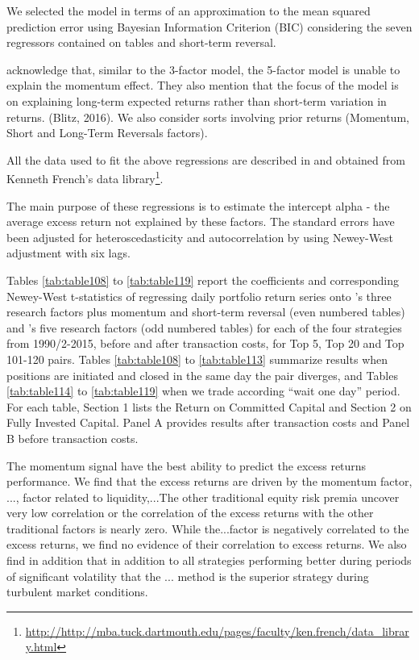 \documentclass[a4paper]{article}
\begin{document}
	We selected the model in terms of an approximation to the mean squared prediction error using Bayesian Information Criterion (BIC) \citet*{Schwarz1978} considering the seven regressors contained on tables and short-term reversal. 
	
	\citet*{fama2016} acknowledge that, similar to the 3-factor model, the 5-factor model is unable to explain the momentum effect. They also mention that the focus of the model is on explaining long-term expected returns rather than short-term variation in returns. (Blitz, 2016). We also consider sorts involving prior returns (Momentum, Short and Long-Term Reversals factors).
	
	All the data used to fit the above regressions are described in and obtained from Kenneth French’s data library\footnote{\url{http://http://mba.tuck.dartmouth.edu/pages/faculty/ken.french/data_library.html}}.
	
	The main purpose of these regressions is to estimate the intercept alpha - the average excess return not explained by these factors. The standard errors have been adjusted for heteroscedasticity and autocorrelation by using Newey-West adjustment with six lags.
	
	Tables \ref{tab:table108} to \ref{tab:table119} report the coefficients and corresponding Newey-West t-statistics of regressing daily portfolio return series onto \citet*{ff93}'s three research factors plus momentum and short-term reversal (even numbered tables) and \citet*{ff15}'s five research factors (odd numbered tables) for each of the four strategies from 1990/2-2015, before and after transaction costs, for Top 5, Top 20 and Top 101-120 pairs. Tables \ref{tab:table108} to \ref{tab:table113} summarize results when positions are initiated and closed in the same day the pair diverges, and Tables \ref{tab:table114} to \ref{tab:table119} when we trade according ``wait one day'' period. For each table, Section 1 lists the Return on Committed Capital and Section 2 on Fully Invested Capital. Panel A provides results after transaction costs and Panel B before transaction costs.
	
	The momentum signal have the best ability to predict the excess returns performance. We find that the excess returns are driven by the momentum factor, ..., factor related to liquidity,...The other traditional equity risk premia uncover very low correlation or the correlation of the excess returns with the other traditional factors is nearly zero. While the...factor is negatively correlated to the excess returns, we find no evidence of their correlation to excess returns. We also find in addition that in addition to all strategies performing better during periods of significant volatility that the ... method is the superior strategy during turbulent market conditions.
	
\end{document}
